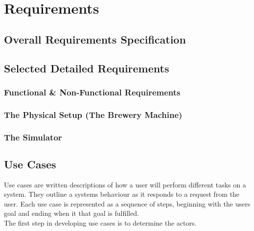 \section{Requirements}

\subsection{Overall Requirements Specification}

\subsection{Selected Detailed Requirements}

\subsubsection{Functional \& Non-Functional Requirements}

\subsubsection{The Physical Setup (The Brewery Machine)}

\subsubsection{The Simulator}


\subsection{Use Cases}
Use cases are written descriptions of how a user will perform different tasks
on a system. They outline a systems behaviour as it responds to a request from
the user. Each use case is represented as a sequence of steps, beginning with
the users goal and ending when it that goal is fulfilled. \\

The first step in developing use cases is to determine the actors.


